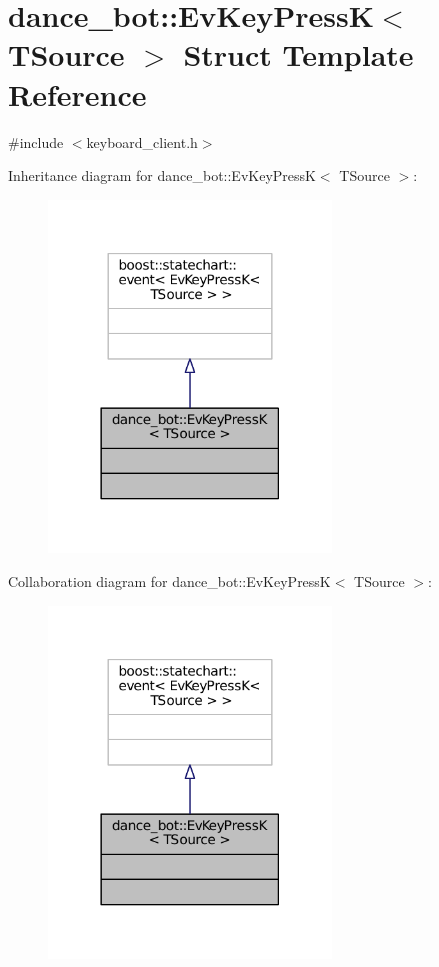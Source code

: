 \hypertarget{structdance__bot_1_1EvKeyPressK}{}\section{dance\+\_\+bot\+:\+:Ev\+Key\+PressK$<$ T\+Source $>$ Struct Template Reference}
\label{structdance__bot_1_1EvKeyPressK}


{\ttfamily \#include $<$keyboard\+\_\+client.\+h$>$}



Inheritance diagram for dance\+\_\+bot\+:\+:Ev\+Key\+PressK$<$ T\+Source $>$\+:
\nopagebreak
\begin{figure}[H]
\begin{center}
\leavevmode
\includegraphics[width=213pt]{structdance__bot_1_1EvKeyPressK__inherit__graph}
\end{center}
\end{figure}


Collaboration diagram for dance\+\_\+bot\+:\+:Ev\+Key\+PressK$<$ T\+Source $>$\+:
\nopagebreak
\begin{figure}[H]
\begin{center}
\leavevmode
\includegraphics[width=213pt]{structdance__bot_1_1EvKeyPressK__coll__graph}
\end{center}
\end{figure}


